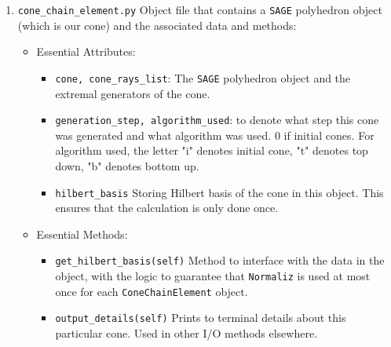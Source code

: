 \documentclass{TC}
\begin{document}
\begin{enumerate}
	
\item \texttt{cone\_chain\_element.py} Object file that contains a \texttt{SAGE} polyhedron object (which is our cone) and the associated data and methods:
	\begin{itemize}
	\item Essential Attributes:
		\begin{itemize}
		\item \texttt{cone, cone\_rays\_list}: The \texttt{SAGE} polyhedron object and the extremal generators of the cone.			
		\item \texttt{generation\_step, algorithm\_used}: to denote what step this cone was generated and what algorithm was used. 0 if initial cones. For algorithm used, the letter "i" denotes initial cone, "t" denotes top down, "b" denotes bottom up.
		\item \texttt{hilbert\_basis} Storing Hilbert basis of the cone in this object. This ensures that the calculation is only done once.
		\end{itemize}
	\item Essential Methods:
		\begin{itemize}
		\item \texttt{get\_hilbert\_basis(self)} Method to interface with the data in the object, with the logic to guarantee that \texttt{Normaliz} is used at most once for each \texttt{ConeChainElement} object.
		\item \texttt{output\_details(self)} Prints to terminal details about this particular cone. Used in other I/O methods elsewhere.
		\end{itemize}
	\end{itemize}
	

\end{enumerate}
\end{document}
